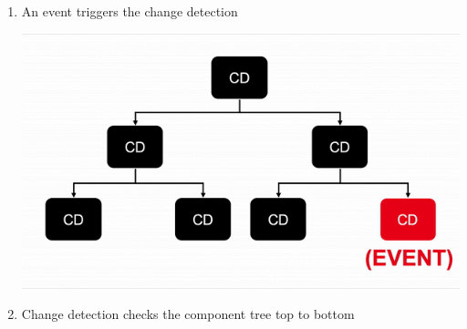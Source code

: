 \begin{enumerate}
	\item An event triggers the change detection \medskip
	
	\includegraphics[width=\linewidth]{cycle1.png} \medskip

	\item Change detection checks the component tree top to bottom \medskip
	

\end{enumerate}
